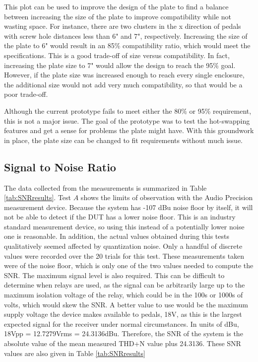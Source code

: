 \documentclass{article}
\begin{document}
	This plot can be used to improve the design of the plate to find a balance between increasing the size of the plate to improve compatibility while not wasting space.  For instance, there are two clusters in the x direction of pedals with screw hole distances less than 6" and 7", respectively.  Increasing the size of the plate to 6" would result in an 85\% compatibility ratio, which would meet the specifications.  This is a good trade-off of size versus compatibility.  In fact, increasing the plate size to 7" would allow the design to reach the 95\% goal.  However, if the plate size was increased enough to reach every single enclosure, the additional size would not add very much compatibility, so that would be a poor trade-off.

	Although the current prototype fails to meet either the 80\% or 95\% requirement, this is not a major issue.  The goal of the prototype was to test the hot-swapping features and get a sense for problems the plate might have.  With this groundwork in place, the plate size can be changed to fit requirements without much issue.


	

	\subsection{Signal to Noise Ratio}
	The data collected from the measurements is summarized in Table \ref{tab:SNRresults}.  Test $A$ shows the limits of observation with the Audio Precision measurement device.  Because the system has -107 dBu noise floor by itself, it will not be able to detect if the DUT has a lower noise floor.  This is an industry standard measurement device, so using this instead of a potentially lower noise one is reasonable.  In addition, the actual values obtained during this tests qualitatively seemed affected by quantization noise.  Only a handful of discrete values were recorded over the 20 trials for this test.  These measurements taken were of the noise floor, which is only one of the two values needed to compute the SNR.  The maximum signal level is also required.  This can be difficult to determine when relays are used, as the signal can be arbitrarily large up to the maximum isolation voltage of the relay, which could be in the 100s or 1000s of volts, which would skew the SNR.  A better value to use would be the maximum supply voltage the device makes available to pedals, 18V, as this is the largest expected signal for the receiver under normal circumstances.  In units of dBu, 18Vpp = 12.7279Vrms = 24.3136dBu.  Therefore, the SNR of the system is the absolute value of the mean measured THD+N value plus 24.3136.  These SNR values are also given in Table \ref{tab:SNRresults}
\end{document}
